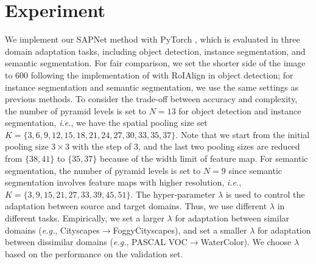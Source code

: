 \documentclass[runningheads]{llncs}
\def\eg{{\em e.g.}}
\def\ie{{\em i.e.}}
\begin{document}
\section{Experiment}
We implement our SAPNet method with PyTorch \cite{paszke2017automatic}, which is evaluated in three domain adaptation tasks, including object detection, instance segmentation, and semantic segmentation. For fair comparison, we set the shorter side of the image to $600$ following the implementation of \cite{DBLP:conf/cvpr/SaitoUHS19,DBLP:journals/corr/abs-1911-02559} with RoIAlign \cite{DBLP:conf/iccv/HeGDG17} in object detection; for instance segmentation and semantic segmentation, we use the same settings as previous methods. To consider the trade-off between accuracy and complexity, the number of pyramid levels is set to $N = 13$ for object detection and instance segmentation, \ie, we have the spatial pooling size set $K=\{3, 6, 9, 12, 15, 18, 21, 24, 27, 30, 33, 35, 37\}$. Note that we start from the initial pooling size $3\times3$ with the step of $3$, and the last two pooling sizes are reduced from $\{38, 41\}$ to $\{35, 37\}$ because of the width limit of feature map. For semantic segmentation, the number of pyramid levels is set to $N = 9$ since semantic segmentation involves feature maps with higher resolution, \ie, $K=\{3, 9, 15, 21, 27, 33, 39, 45, 51\}$. The hyper-parameter $\lambda$ is used to control the adaptation between source and target domains. Thus, we use different $\lambda$ in different tasks. Empirically, we set a larger $\lambda$ for adaptation between similar domains (\eg, Cityscapes$\to$FoggyCityscapes), and set a smaller $\lambda$ for adaptation between dissimilar domains (\eg, PASCAL VOC$\to$WaterColor). We choose $\lambda$ based on the performance on the validation set.
\end{document}
